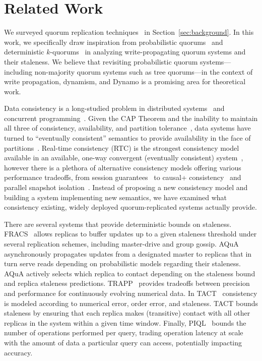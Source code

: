 \documentclass{vldb}
\begin{document}
\section{Related Work}
\label{sec:relatedwork}

We surveyed quorum replication
techniques~\cite{prob-quorum-dynamic,non-strict, multi-k-quorum,
  quorum-start,quorum-placement, quorums-alternative, prob-quorum,
  quorum-overview, quorumsystems} in Section~\ref{sec:background}.  In
this work, we specifically draw inspiration from probabilistic
quorums~\cite{prob-quorum} and deterministic
$k$-quorums~\cite{multi-k-quorum, non-strict} in analyzing
write-propagating quorum systems and their staleness.  We believe that
revisiting probabilistic quorum systems---including non-majority
quorum systems such as tree quorums---in the context of write
propagation, dynamism, and Dynamo is a promising area for theoretical
work.

Data consistency is a long-studied problem in distributed
systems~\cite{consistency-partitioned, danger-rep} and concurrent
programming~\cite{linearizability}.  Given the CAP Theorem and the
inability to maintain all three of consistency, availability, and
partition tolerance~\cite{cap-proof}, data systems have turned to
``eventually consistent'' semantics to provide availability in the
face of partitions~\cite{consistency-partitioning, vogels-defs}.
Real-time consistency (RTC) is the strongest consistency model
available in an available, one-way convergent (eventually consistent)
system~\cite{rtc-proof}, however there is a plethora of alternative
consistency models offering various performance tradeoffs, from
session guarantees~\cite{sessionguarantees} to causal+
consistency~\cite{cops} and parallel snapshot isolation~\cite{walter}.
Instead of proposing a new consistency model and building a system
implementing new semantics, we have examined what consistency
existing, widely deployed quorum-replicated systems actually provide.

There are several systems that provide deterministic bounds on
staleness.  FRACS~\cite{frac} allows replicas to buffer updates up to
a given staleness threshold under several replication schemes,
including master-drive and group gossip.  AQuA~\cite{aqua}
asynchronously propagates updates from a designated master to replicas
that in turn serve reads depending on probabilistic models regarding
their staleness.  AQuA actively selects which replica to contact
depending on the staleness bound and replica staleness predictions.
TRAPP~\cite{trapp} provides tradeoffs between precision and
performance for continuously evolving numerical data.  In
TACT~\cite{vahdat-article, vahdat-bounded} consistency is modeled
according to numerical error, order error, and staleness.  TACT bounds
staleness by ensuring that each replica makes (transitive) contact
with all other replicas in the system within a given time window.
Finally, PIQL~\cite{piql} bounds the number of operations performed
per query, trading operation latency at scale with the amount of data
a particular query can access, potentially impacting accuracy.
\end{document}
